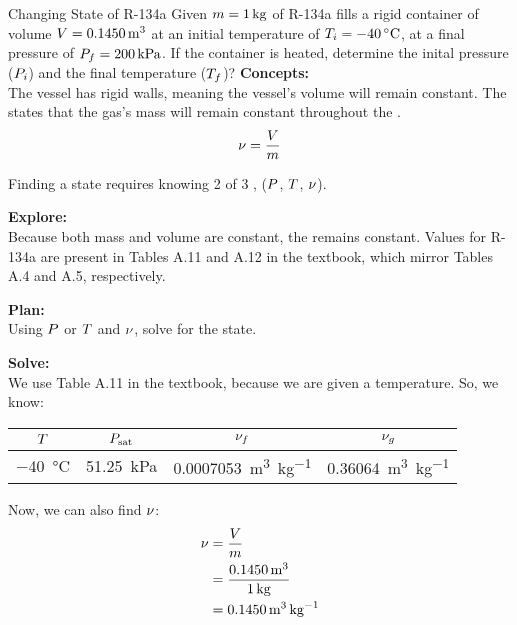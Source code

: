 \begin{example}[Problem 4.112]{Changing State of R-134a}
  Given $m = \SI{1}{\kilo\gram}$ of R-134a fills a rigid container of volume $V = \SI{0.1450}{\meter\cubed}$ at an initial temperature of $\Temp_{i} = \SI{-40}{\degreeCelsius}$, at a final pressure of $P_{f} = \SI{200}{\kilo\pascal}$.
  If the container is heated, determine the inital pressure ($P_{i}$) and the final temperature ($T_{f}$)?
  \tcblower{}
  \textbf{Concepts:} \\
  The vessel has rigid walls, meaning the vessel's volume will remain constant.
  The  states that the gas's mass will remain constant throughout the . \\
  \begin{equation*}
    \nu = \frac{V}{m}
  \end{equation*}

  Finding a state requires knowing 2 of 3 , ($P$, $T$, $\nu$).

  \textbf{Explore:} \\
  Because both mass and volume are constant, the  remains constant.
  Values for R-134a are present in Tables A.11 and A.12 in the textbook, which mirror Tables A.4 and A.5, respectively.

  \textbf{Plan:} \\
  Using $P$ or $T$ and $\nu$, solve for the state.

  \textbf{Solve:} \\
  We use Table A.11 in the textbook, because we are given a temperature.
  So, we know:
  \begin{center}
    \begin{tabular}{cccc}
      \toprule
      $T$ & $P_{\mathrm{sat}}$ & $\nu_{f}$ & $\nu_{g}$ \\
      \midrule
      \SI{-40}{\degreeCelsius} & \SI{51.25}{\kilo\pascal} & \SI{0.0007053}{\meter\cubed\per\kilo\gram} & \SI{0.36064}{\meter\cubed\per\kilo\gram} \\
      \bottomrule
    \end{tabular}
  \end{center}

  Now, we can also find $\nu$:
  \begin{align*}
    \nu &= \frac{V}{m} \\
                    &= \frac{\SI{0.1450}{\meter\cubed}}{\SI{1}{\kilo\gram}} \\
                    &= \SI{0.1450}{\meter\cubed\per\kilo\gram}
  \end{align*}


\end{example}

